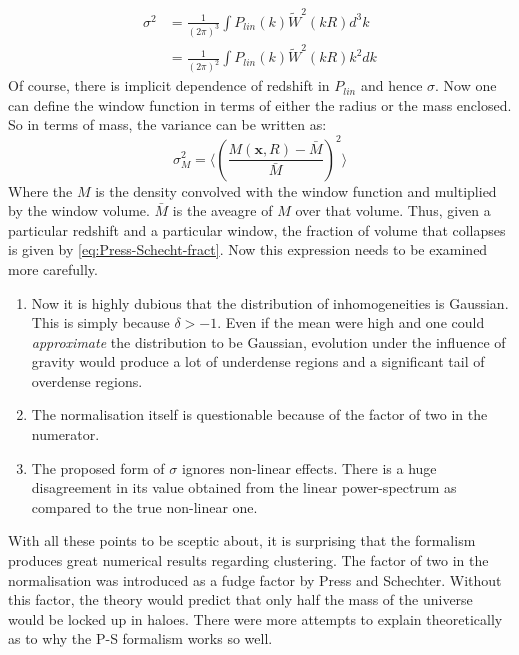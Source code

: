 \documentclass[12pt,a4paper,twoside]{book}
\begin{document}
		$$
			\begin{aligned}
				\sigma^2&=\frac{1}{(2\pi)^3}\int P_{lin}(k)\tilde{W}^2(kR)d^3k\\
				&=\frac{1}{(2\pi)^2}\int P_{lin}(k)\tilde{W}^2(kR)k^2dk
			\end{aligned}
		$$
		Of course, there is implicit dependence of redshift in $P_{lin}$ and hence $\sigma$. Now one can define the window function in terms of either the radius or the mass enclosed. So in terms of mass, the variance can be written as:
		$$
			\sigma^2_M=\Big\langle\left(\frac{M(\mathbf{x},R)-\bar{M}}{\bar{M}}\right)^2\Big\rangle
		$$
		Where the $M$ is the density convolved with the window function and multiplied by the window volume. $\bar{M}$ is the aveagre of $M$ over that volume. 
		Thus, given a particular redshift and a particular window, the fraction of volume that collapses is given by \ref{eq:Press-Schecht-fract}. Now this expression needs to be examined more carefully.
		\begin{enumerate}
			\item Now it is highly dubious that the distribution of inhomogeneities is Gaussian. This is simply because $\delta>-1$. Even if the mean were high and one could \emph{approximate} the distribution to be Gaussian, evolution under the influence of gravity would produce a lot of underdense regions and a significant tail of overdense regions. 
			\item The normalisation itself is questionable because of the factor of two in the numerator.
			\item The proposed form of $\sigma$ ignores non-linear effects. There is a huge disagreement in its value obtained from the linear power-spectrum as compared to the true non-linear one.
		\end{enumerate}
		With all these points to be sceptic about, it is surprising that the formalism produces great numerical results regarding clustering. The factor of two in the normalisation was introduced as a fudge factor by Press and Schechter. Without this factor, the theory would predict that only half the mass of the universe would be locked up in haloes. There were more attempts to explain theoretically as to why the P-S formalism works so well.
		
\end{document}
